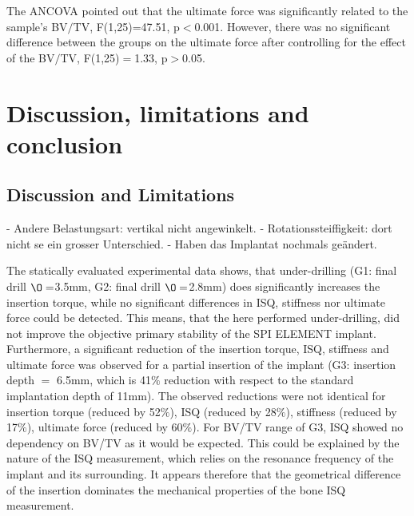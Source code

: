 \documentclass[12pt, a4paper, twoside]{report}
\begin{document}
%
The ANCOVA pointed out that the ultimate force was significantly related to the sample's BV$/$TV, F(1,25)=47.51, p$<$0.001.
However, there was no significant difference between the groups on the ultimate force after controlling for the effect of the BV$/$TV, F(1,25)$=$1.33, p$>$0.05.
%
%
%
\newpage
%
%
%
\chapter{Discussion, limitations and conclusion}
%
%
%
\section{Discussion and Limitations}

- Andere Belastungsart: vertikal nicht angewinkelt.
- Rotationssteiffigkeit: dort nicht se ein grosser Unterschied.
- Haben das Implantat nochmals geändert.

%
The statically evaluated experimental data shows, that under-drilling (G1: final drill $\O=$3.5mm, G2: final drill $\O=$2.8mm) does significantly increases the insertion torque, while no significant differences in ISQ, stiffness nor ultimate force could be detected. This means, that the here performed under-drilling, did not improve the objective primary stability of the SPI ELEMENT implant. \\
Furthermore, a significant reduction of the insertion torque, ISQ, stiffness and ultimate force was observed for a partial insertion of the implant (G3: insertion depth $=$ 6.5mm, which is 41$\%$ reduction with respect to the standard implantation depth of 11mm). The observed reductions were not identical for insertion torque (reduced by 52$\%$), ISQ (reduced by 28$\%$), stiffness (reduced by 17$\%$), ultimate force (reduced by 60$\%$). For BV/TV range of G3, ISQ showed no dependency on BV/TV as it would be expected. This could be explained by the nature of the ISQ measurement, which relies on the resonance frequency of the implant and its surrounding. It appears therefore that the geometrical difference of the insertion dominates the mechanical properties of the bone ISQ measurement. 
\end{document}
